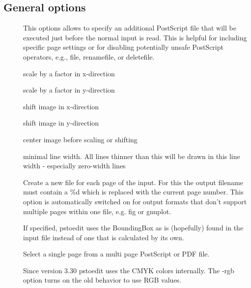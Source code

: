 \documentclass[english,a4paper]{article}
\begin{document}
\subsection{General options}
\begin{description}
\item[] 
This options allows to specify an additional PostScript file that will be executed just before the normal input is read. This is helpful for including specific page settings or for disabling potentially unsafe PostScript operators, e.g., file, renamefile, or deletefile. 


\item[] 
scale by a factor in x-direction


\item[] 
scale by a factor in y-direction


\item[] 
shift image in x-direction


\item[] 
shift image in y-direction


\item[] 
center image before scaling or shifting


\item[] 
minimal line width. All lines thinner than this will be drawn in this line width - especially zero-width lines


\item[] 
Create a new file for each page of the input. For this the output filename must contain a \%d which is replaced with the current page number. This option is automatically switched on for output formats that don't support multiple pages within one file, e.g. fig or gnuplot. 


\item[] 
If specified, pstoedit uses the BoundingBox as is (hopefully) found in the input file instead of one that is calculated by its own. 


\item[] 
Select a single page from a multi page PostScript or PDF file. 


\item[] 
Since version 3.30 pstoedit uses the CMYK colors internally. The -rgb option turns on the old behavior to use RGB values.



\end{description}
\end{document}
